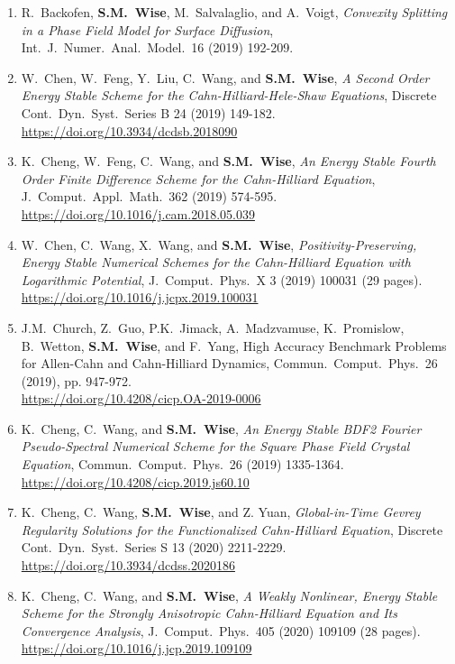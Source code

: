 \documentclass[10pt,letterpaper]{article}
\begin{document}
\begin{enumerate}
	\item
R.~Backofen, \textbf{S.M.~Wise}, M.~Salvalaglio, and A.~Voigt, {\sl Convexity Splitting in a Phase Field Model for Surface Diffusion}, Int.~J.~Numer.~Anal.~Model.~16 (2019) 192-209.

	\item
W.~Chen, W.~Feng, Y.~Liu, C.~Wang, and \textbf{S.M.~Wise}, {\sl A Second Order Energy Stable Scheme for the Cahn-Hilliard-Hele-Shaw Equations}, Discrete Cont.~Dyn.~Syst.~Series B 24 (2019) 149-182.
	\\ 
\url{https://doi.org/10.3934/dcdsb.2018090}

		\item
K.~Cheng, W.~Feng, C.~Wang, and \textbf{S.M.~Wise}, {\sl An Energy Stable Fourth Order Finite Difference Scheme for the Cahn-Hilliard Equation}, J.~Comput.~Appl.~Math.~362 (2019) 574-595.
	\\ 
\url{https://doi.org/10.1016/j.cam.2018.05.039}

    \item
W.~Chen, C.~Wang, X.~Wang, and \textbf{S.M.~Wise}, {\sl Positivity-Preserving, Energy Stable Numerical Schemes for the Cahn-Hilliard Equation with Logarithmic Potential}, J.~Comput.~Phys.~X 3 (2019) 100031 (29 pages).
	\\ 
\url{https://doi.org/10.1016/j.jcpx.2019.100031}

	\item
J.M.~Church, Z.~Guo, P.K.~Jimack, A.~Madzvamuse, K.~Promislow, B.~Wetton, \textbf{S.M.~Wise}, and F.~Yang, {High Accuracy Benchmark Problems for Allen-Cahn and Cahn-Hilliard Dynamics}, Commun.~Comput.~Phys.~26 (2019), pp. 947-972.
	\\ 
\url{https://doi.org/10.4208/cicp.OA-2019-0006}

	\item
K.~Cheng, C.~Wang, and \textbf{S.M.~Wise}, {\sl An Energy Stable BDF2 Fourier Pseudo-Spectral Numerical Scheme for the Square Phase Field Crystal Equation}, Commun.~Comput.~Phys.~26 (2019) 1335-1364.
	\\ 
\url{https://doi.org/10.4208/cicp.2019.js60.10}

	\item
K.~Cheng, C.~Wang, \textbf{S.M.~Wise}, and Z. Yuan, {\sl Global-in-Time Gevrey Regularity Solutions for the Functionalized Cahn-Hilliard Equation}, Discrete Cont.~Dyn.~Syst.~Series S 13 (2020) 2211-2229.
	\\ 
\url{https://doi.org/10.3934/dcdss.2020186}

	\item
K.~Cheng, C.~Wang, and \textbf{S.M.~Wise}, {\sl A Weakly Nonlinear, Energy Stable Scheme for the Strongly Anisotropic Cahn-Hilliard Equation and Its Convergence Analysis}, J.~Comput.~Phys.~405 (2020) 109109 (28 pages).
	\\ 
\url{https://doi.org/10.1016/j.jcp.2019.109109}


\end{enumerate}
\end{document}
